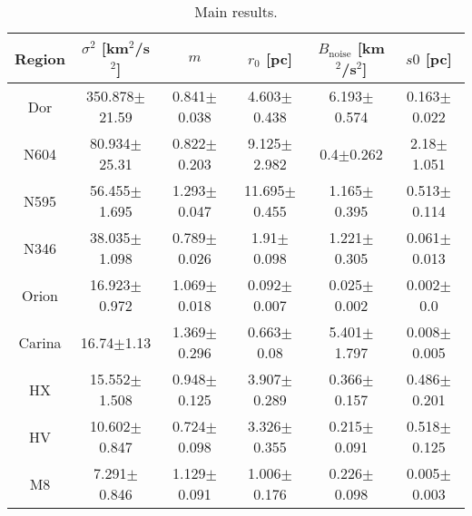 \begin{table*}
\begin{center}
\caption{Main results.}
\begin{tabular}{cccccc}
\hline
  Region & $\sigma^2$ [km$^2$/s$^2$] &              $m$ &        $r_0$ [pc] & $B_{\text{noise}}$ [km$^2$/s$^2$] &        $s0$ [pc] \\
\hline
     Dor &         350.878$\pm$21.59 &  0.841$\pm$0.038 &   4.603$\pm$0.438 &            6.193$\pm$0.574 &  0.163$\pm$0.022 \\
   N604 &          80.934$\pm$25.31 &  0.822$\pm$0.203 &   9.125$\pm$2.982 &              0.4$\pm$0.262 &   2.18$\pm$1.051 \\
    N595 &          56.455$\pm$1.695 &  1.293$\pm$0.047 &  11.695$\pm$0.455 &            1.165$\pm$0.395 &  0.513$\pm$0.114 \\
    N346 &          38.035$\pm$1.098 &  0.789$\pm$0.026 &    1.91$\pm$0.098 &            1.221$\pm$0.305 &  0.061$\pm$0.013 \\
  Orion  &          16.923$\pm$0.972 &  1.069$\pm$0.018 &   0.092$\pm$0.007 &            0.025$\pm$0.002 &    0.002$\pm$0.0 \\
    Carina &            16.74$\pm$1.13 &  1.369$\pm$0.296 &    0.663$\pm$0.08 &            5.401$\pm$1.797 &  0.008$\pm$0.005 \\
      HX &          15.552$\pm$1.508 &  0.948$\pm$0.125 &   3.907$\pm$0.289 &            0.366$\pm$0.157 &  0.486$\pm$0.201 \\
      HV &          10.602$\pm$0.847 &  0.724$\pm$0.098 &   3.326$\pm$0.355 &            0.215$\pm$0.091 &  0.518$\pm$0.125 \\
      M8 &           7.291$\pm$0.846 &  1.129$\pm$0.091 &   1.006$\pm$0.176 &            0.226$\pm$0.098 &  0.005$\pm$0.003 \\
\hline

\end{tabular}\label{tab:Res}
\end{center}
\end{table*}
